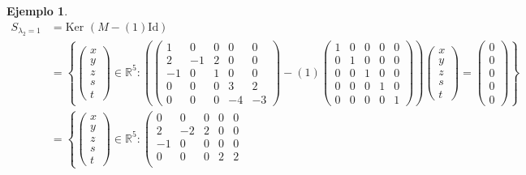 \documentclass[12pt]{book}
\newtheorem{ejem}{Ejemplo}
\def\R{\mathbb{R}}
\begin{document}
{\begin{ejem}
{\begin{align*}
 S_{\lambda_2=1 }  &  =\text{Ker }(M-(1)\text{Id})\\
         &  =\left\{\left(\begin{matrix}x\\ y \\ z \\ s \\ t \end{matrix}\right)\in\R^5:\left(
         \left(\begin{matrix}
         1 & 0 & 0 & 0 & 0 \\ 
         2 & -1 & 2 & 0 & 0 \\ 
         -1 & 0 & 1 & 0 & 0 \\ 
         0 & 0 & 0 & 3 & 2 \\ 
         0 & 0 & 0 & -4 & -3 
         \end{matrix}\right)-(1)\left(\begin{matrix}1 & 0 & 0 & 0 & 0 \\ 0 & 1 & 0 & 0 & 0 \\ 0 & 0 & 1 & 0 & 0 \\ 0 & 0 & 0 & 1 & 0 \\ 0 & 0 & 0 & 0 & 1 \end{matrix}\right)\right)\left(\begin{matrix}x\\ y \\ z \\ s \\ t \end{matrix}\right)=\left(\begin{matrix}0\\ 0 \\ 0 \\ 0 \\ 0 \end{matrix}\right)\right\} \\
        &  =\left\{\left(\begin{matrix}x\\ y \\ z \\ s \\ t \end{matrix}\right)\in\R^5:
         \left(\begin{matrix}
         0 & 0 & 0 & 0 & 0 \\ 
         2 & -2 & 2 & 0 & 0 \\ 
         -1 & 0 & 0 & 0 & 0 \\ 
         0 & 0 & 0 & 2 & 2 \\ 

\end{matrix}
\end{align*}}
\end{ejem}}
\end{document}
